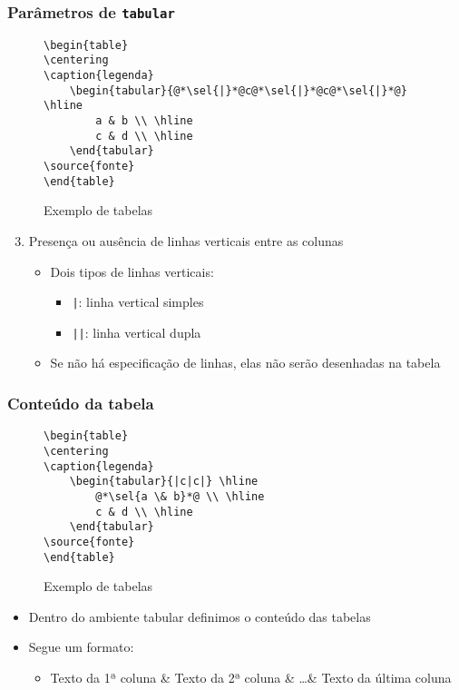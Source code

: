 \begin{frame}[fragile] \frametitle{Parâmetros de \texttt{tabular}}
\vspace{-0.5cm}
\begin{figure}[!t]
\caption{Exemplo de tabelas}
\begin{lstlisting}
\begin{table}
\centering
\caption{legenda}
	\begin{tabular}{@*\sel{|}*@c@*\sel{|}*@c@*\sel{|}*@} \hline
		a & b \\ \hline
		c & d \\ \hline
	\end{tabular}
\source{fonte}
\end{table}
\end{lstlisting}
\ownsrc
\end{figure}

\begin{enumerate}
	\setcounter{enumi}{2}
	\item Presença ou ausência de linhas verticais entre as colunas
	\begin{itemize}
		\item Dois tipos de linhas verticais:
		\begin{itemize}
			\item \texttt{|}: linha vertical simples
			\item \texttt{||}: linha vertical dupla
		\end{itemize}
		\item Se não há especificação de linhas, elas não serão desenhadas na tabela
	\end{itemize}
\end{enumerate}
\end{frame}

\begin{frame}[fragile] \frametitle{Conteúdo da tabela}
\vspace{-0.5cm}
\begin{figure}[!t]
\caption{Exemplo de tabelas}
\begin{lstlisting}
\begin{table}
\centering
\caption{legenda}
	\begin{tabular}{|c|c|} \hline
		@*\sel{a \& b}*@ \\ \hline
		c & d \\ \hline
	\end{tabular}
\source{fonte}
\end{table}
\end{lstlisting}
\ownsrc
\end{figure}

\begin{itemize}
	\item Dentro do ambiente tabular definimos o conteúdo das tabelas
	\item Segue um formato:
	\begin{itemize}
		\item Texto da 1ª coluna \& Texto da 2ª coluna \& \ldots \& Texto da última coluna
	\end{itemize}
\end{itemize}
\end{frame}

